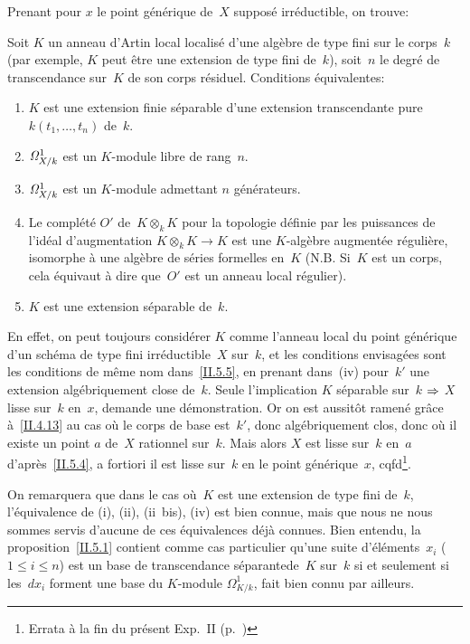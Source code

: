 Prenant pour $x$ le point g\'en\'erique de~$X$ suppos\'e
irr\'eductible, on trouve:

\begin{corollaire}
\label{II.5.6}
Soit $K$ un anneau d'Artin local localis\'e d'une alg\`ebre de
type fini sur le corps~$k$ (par exemple, $K$ peut \^etre une
extension de type fini de~$k$), soit~$n$ le degr\'e de transcendance
sur~$K$ de son corps r\'esiduel. Conditions \'equivalentes:
\begin{enumerate}
\item[(i)] $K$ est une extension finie s\'eparable d'une extension
transcendante pure $k(t_1,\dots,t_n)$ de~$k$.
\item[(ii)]
$\it{\Omega}^1_{X/k}$
est un $K$-module libre de rang~$n$.
\item[(ii~bis)]
$\it{\Omega}^1_{X/k}$
est un $K$-module admettant $n$
g\'en\'erateurs.
\item[(iii)] Le compl\'et\'e $O'$ de~$K\otimes_k K$ pour la
topologie d\'efinie par les puissances de l'id\'eal d'augmentation
$K\otimes_k K\to K$ est une
$K$-alg\`ebre
augment\'ee \og r\'eguli\`ere\fg, \ie isomorphe \`a une
alg\`ebre de s\'eries formelles en~$K$ (N.B. Si~$K$ est un corps,
cela \'equivaut \`a dire que~$O'$ est un anneau local
r\'egulier).
\item[(iv)] $K$ est une extension s\'eparable de~$k$.
\end{enumerate}
\end{corollaire}

En effet, on peut toujours consid\'erer $K$ comme l'anneau local du
point g\'en\'erique d'un sch\'ema de type fini
irr\'eductible~$X$ sur~$k$, et les conditions envisag\'ees sont
les conditions de m\^eme nom dans~\ref{II.5.5}, en prenant dans~(iv)
pour~$k'$ une extension alg\'ebriquement close de~$k$. Seule
l'implication $K$ s\'eparable sur~$k$ $\To$ $X$ lisse sur~$k$ en~$x$, demande une d\'emonstration. Or on est aussit\^ot
ramen\'e gr\^ace \`a~\ref{II.4.13} au cas o\`u le corps de
base est~$k'$, donc alg\'ebriquement clos, donc o\`u il existe un
point $a$ de~$X$ rationnel sur~$k$. Mais alors $X$ est lisse sur~$k$
en~$a$ d'apr\`es~\ref{II.5.4}, a fortiori il est lisse sur~$k$ en le
point g\'en\'erique~$x$, cqfd\footnote{\Cf Errata \`a la fin du pr\'esent Exp.\, II
(p.\, \pageref{II.fin.errata})}.

On remarquera que dans le cas o\`u~$K$ est une extension de type
fini de~$k$, l'\'equivalence de
(i), (ii), (ii~bis), (iv)
est bien
connue, mais que nous ne nous sommes servis d'aucune de
ces
\'equivalences
d\'ej\`a connues. Bien entendu, la
proposition~\ref{II.5.1} contient comme cas particulier qu'une suite
d'\'el\'ements~$x_i$ ($1\leq i\leq n$) est un \og base de
transcendance s\'eparante\fg de~$K$ sur~$k$ si et seulement si
les~$dx_i$ forment une base du $K$-module $\Omega^1_{K/k}$, fait bien
connu par ailleurs.

